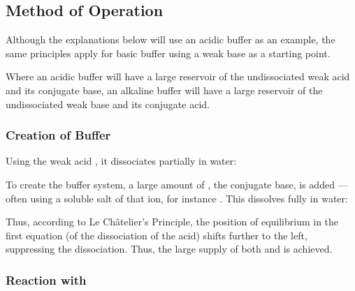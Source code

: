 

		\subsection{Method of Operation}

			Although the explanations below will use an acidic buffer as an example, the same principles apply for basic buffer using a weak
			base as a starting point.

			Where an acidic buffer will have a large reservoir of the undissociated weak acid and its conjugate base, an alkaline buffer will
			have a large reservoir of the undissociated weak base and its conjugate acid.

			\subsubsection{Creation of Buffer}

				Using the weak acid , it dissociates partially in water:


				To create the buffer system, a large amount of , the conjugate base, is added --- often using a soluble salt of
				that ion, for instance . This dissolves fully in water:


				Thus, according to Le Châtelier's Principle, the position of equilibrium in the first equation (of the dissociation of the acid)
				shifts further to the left, suppressing the dissociation. Thus, the large supply of both  and  is
				achieved.



			\pagebreak
			\subsubsection{Reaction with }

